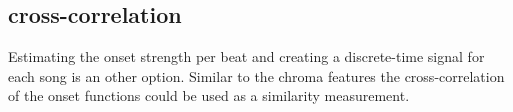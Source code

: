 \subsection{cross-correlation}

Estimating the onset strength per beat and creating a discrete-time signal for each song is an other option. Similar to the chroma features the cross-correlation of the onset functions could be used as a similarity measurement. 

\begin{figure}[htbp]
	\centering
\end{figure}
